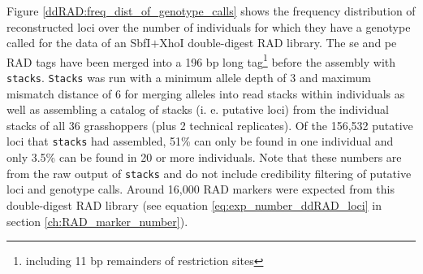 \documentclass[a4paper,12pt,times,authoryear,twoside,print,index]{Classes/PhDThesisPSnPDF}\usepackage[]{graphicx}\usepackage[]{color}
\begin{document}

Figure \ref{ddRAD:freq_dist_of_genotype_calls} shows the frequency distribution of reconstructed loci over the number of individuals for which they have a genotype called for the data of an \gls{SbfI}$+$\gls{XhoI} double-digest RAD library. The \gls{se} and \gls{pe} \glspl{RAD tag} have been merged into a 196 \gls{bp} long tag\footnote{including 11 bp remainders of restriction sites} before the assembly with \texttt{stacks}. \texttt{Stacks} was run with a minimum allele depth of 3 and maximum mismatch distance of 6 for merging alleles into read stacks within individuals as well as assembling a catalog of stacks (i. e. putative loci) from the individual stacks of all 36 grasshoppers (plus 2 technical replicates). Of the 156,532 putative loci that \texttt{stacks} had assembled, 51\% can only be found in one individual and only 3.5\% can be found in 20 or more individuals. Note that these numbers are from the raw output of \texttt{stacks} and do not include credibility filtering of putative loci and genotype calls. Around 16,000 RAD markers were expected from this double-digest RAD library (see equation \ref{eq:exp_number_ddRAD_loci} in section \ref{ch:RAD_marker_number}).
%
%
\end{document}
